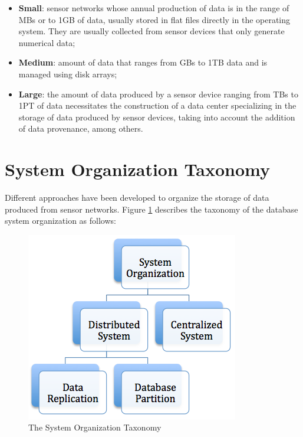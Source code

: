 \begin{itemize}
  \item \textbf{Small}: sensor networks whose annual production of data is in the
  range of MBs or to 1GB of data, usually stored in flat files directly in the
  operating system. They are usually collected from sensor devices that only
  generate numerical data;
  \item \textbf{Medium}: amount of data that ranges from GBs to 1TB data and is 
  managed using disk arrays;
  \item \textbf{Large}: the amount of data produced by a sensor device ranging 
  from TBs to 1PT of data necessitates the construction of a data center 
  specializing in the storage of data produced by sensor devices, taking into 
  account the addition of data provenance, among others.
\end{itemize}

\section{System Organization Taxonomy} 

Different approaches have been developed to organize the storage of data
produced from sensor networks. Figure \ref{fig:taxonomy-database-architecture}
describes the taxonomy of the database system organization as follows:

\begin{figure}[h]
  \centering
  \includegraphics[scale=0.5]{../diagrams/taxonomy-database-architecture}
  \caption{The System Organization Taxonomy}
  \label{fig:taxonomy-database-architecture}
\end{figure}

